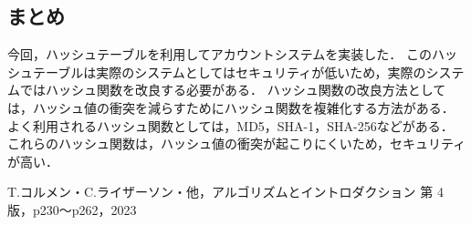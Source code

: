 \documentclass{ltjsarticle}
\begin{document}
\subsection{まとめ}
今回，ハッシュテーブルを利用してアカウントシステムを実装した．
このハッシュテーブルは実際のシステムとしてはセキュリティが低いため，実際のシステムではハッシュ関数を改良する必要がある．
ハッシュ関数の改良方法としては，ハッシュ値の衝突を減らすためにハッシュ関数を複雑化する方法がある．
よく利用されるハッシュ関数としては，MD5，SHA-1，SHA-256などがある．
これらのハッシュ関数は，ハッシュ値の衝突が起こりにくいため，セキュリティが高い．

\begin{thebibliography}{9}
 T.コルメン・C.ライザーソン・他，アルゴリズムとイントロダクション 第 4 版，p230～p262，2023
\end{thebibliography}
\end{document}
